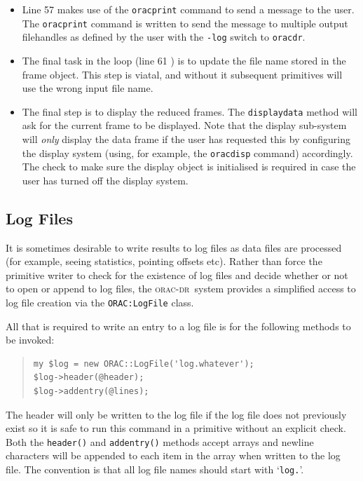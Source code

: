 \documentclass[twoside,11pt]{article}
\renewcommand{\_}{\texttt{\symbol{95}}}
\newcommand{\Oracdr}{\textsc{orac-dr}}
\newcommand{\oracdr}{\texttt{oracdr}}
\newenvironment{myquote}{\begin{quote}\begin{small}}{\end{small}\end{quote}}
\begin{document}
\begin{itemize}
\item Line 57 makes use of the \texttt{orac\_print} command to send a
message to the user. The \texttt{orac\_print} command is written to
send the message to multiple output filehandles as defined by the user 
with the \texttt{-log} switch to \oracdr.

\item The final task in the loop (line 61 ) is to update the file name
stored in the frame object. This step is viatal, and without it subsequent
primitives will use the wrong input file name. 

\item The final step is to display the reduced frames. The
\texttt{display\_data} method will ask for the current frame to be
displayed. Note that the display sub-system will \emph{only} display
the data frame if the user has requested this by configuring the
display system (using, for example, the \texttt{oracdisp} command)
accordingly. The check to make sure the display object is initialised
is required in case the user has turned off the display system.

\end{itemize}

\subsection{Log Files\label{logfiles}}

It is sometimes desirable to write results to log files as data
files are processed (for example, seeing statistics, pointing offsets
etc). Rather than force the primitive writer to check for the
existence of log files and decide whether or not to open or append to
log files, the \Oracdr\ system provides a simplified access to log
file creation via the \texttt{ORAC:LogFile} class.

All that is required to write an entry to a log file is for the
following methods to be invoked:
\begin{myquote}
\begin{verbatim}
my $log = new ORAC::LogFile('log.whatever');
$log->header(@header);
$log->addentry(@lines);
\end{verbatim}
\end{myquote} %
The header will only be written to the log file if the log file
does not previously exist so it is safe to run this command in a
primitive without an explicit check. Both the \texttt{header()} and
\texttt{addentry()} methods accept arrays and newline characters will
be appended to each item in the array when written to the log file.
The convention is that all log file names should start with `\texttt{log.}'.
\end{document}

